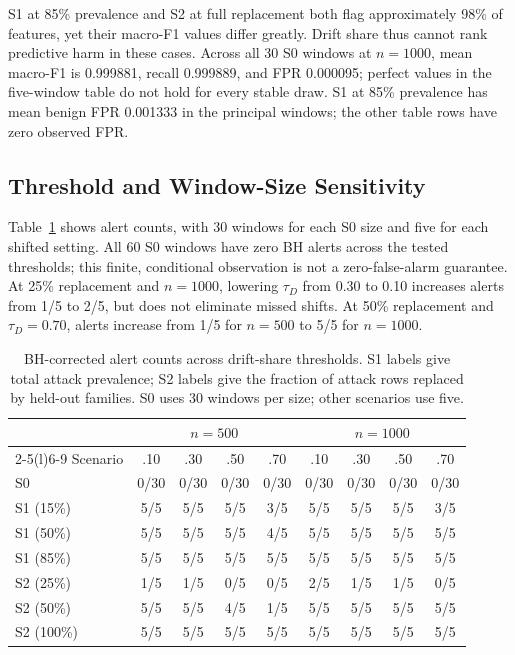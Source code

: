 \documentclass[runningheads]{llncs}
\begin{document}
S1 at 85\% prevalence and S2 at full replacement both flag approximately 98\% of features, yet their macro-F1 values differ greatly. Drift share thus cannot rank predictive harm in these cases. Across all 30 S0 windows at $n=1000$, mean macro-F1 is 0.999881, recall 0.999889, and FPR 0.000095; perfect values in the five-window table do not hold for every stable draw. S1 at 85\% prevalence has mean benign FPR 0.001333 in the principal windows; the other table rows have zero observed FPR.

\subsection{Threshold and Window-Size Sensitivity}
Table~\ref{tab:sensitivity} shows alert counts, with 30 windows for each S0 size and five for each shifted setting. All 60 S0 windows have zero BH alerts across the tested thresholds; this finite, conditional observation is not a zero-false-alarm guarantee. At 25\% replacement and $n=1000$, lowering $\tau_D$ from 0.30 to 0.10 increases alerts from 1/5 to 2/5, but does not eliminate missed shifts. At 50\% replacement and $\tau_D=0.70$, alerts increase from 1/5 for $n=500$ to 5/5 for $n=1000$.

\begin{table}[t]
\centering
\caption{BH-corrected alert counts across drift-share thresholds. S1 labels give total attack prevalence; S2 labels give the fraction of attack rows replaced by held-out families. S0 uses 30 windows per size; other scenarios use five.}
\label{tab:sensitivity}
\scriptsize
\begin{tabular*}{\linewidth}{@{\extracolsep{\fill}}l*{8}{c}@{}}
\toprule
& \multicolumn{4}{c}{$n=500$} & \multicolumn{4}{c}{$n=1000$} \\
\cmidrule(lr){2-5}\cmidrule(l){6-9}
Scenario & .10 & .30 & .50 & .70 & .10 & .30 & .50 & .70 \\
\midrule
S0 & 0/30 & 0/30 & 0/30 & 0/30 & 0/30 & 0/30 & 0/30 & 0/30 \\
S1 (15\%) & 5/5 & 5/5 & 5/5 & 3/5 & 5/5 & 5/5 & 5/5 & 3/5 \\
S1 (50\%) & 5/5 & 5/5 & 5/5 & 4/5 & 5/5 & 5/5 & 5/5 & 5/5 \\
S1 (85\%) & 5/5 & 5/5 & 5/5 & 5/5 & 5/5 & 5/5 & 5/5 & 5/5 \\
S2 (25\%) & 1/5 & 1/5 & 0/5 & 0/5 & 2/5 & 1/5 & 1/5 & 0/5 \\
S2 (50\%) & 5/5 & 5/5 & 4/5 & 1/5 & 5/5 & 5/5 & 5/5 & 5/5 \\
S2 (100\%) & 5/5 & 5/5 & 5/5 & 5/5 & 5/5 & 5/5 & 5/5 & 5/5 \\
\bottomrule
\end{tabular*}
\end{table}
\end{document}

